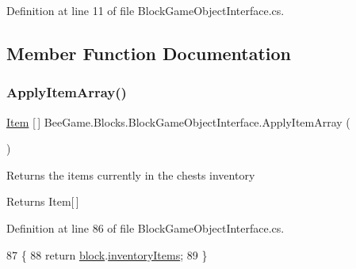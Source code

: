 Definition at line 11 of file Block\+Game\+Object\+Interface.\+cs.



\subsection{Member Function Documentation}
\mbox{\label{class_bee_game_1_1_blocks_1_1_block_game_object_interface_a9e53e6213fec0b1f7a3ed16f50e3d894}} 
\subsubsection{\texorpdfstring{Apply\+Item\+Array()}{ApplyItemArray()}}
{\footnotesize\ttfamily \hyperlink{struct_bee_game_1_1_items_1_1_item}{Item} \mbox{[}$\,$\mbox{]} Bee\+Game.\+Blocks.\+Block\+Game\+Object\+Interface.\+Apply\+Item\+Array (\begin{DoxyParamCaption}{ }\end{DoxyParamCaption})}



Returns the items currently in the chests inventory 

\begin{DoxyReturn}{Returns}
Item\mbox{[}$\,$\mbox{]}
\end{DoxyReturn}


Definition at line 86 of file Block\+Game\+Object\+Interface.\+cs.


\begin{DoxyCode}
87         \{
88             \textcolor{keywordflow}{return} \hyperlink{class_bee_game_1_1_blocks_1_1_block_game_object_interface_a238bad3b956ec84c8b1cc3127948b75d}{block}.\hyperlink{class_bee_game_1_1_blocks_1_1_block_a54846c7c7ec2f512484b3060de977fac}{inventoryItems};
89         \}
\end{DoxyCode}
\mbox{\label{class_bee_game_1_1_blocks_1_1_block_game_object_interface_acc64daab8f2771a344aa386fa4b86c3b}} 
